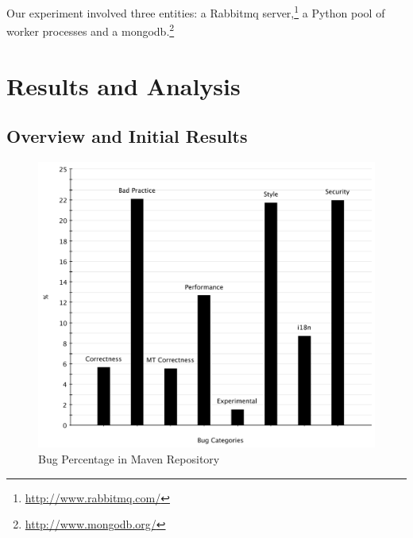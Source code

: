 \documentclass[conference]{IEEEtran}
\begin{document}
Our experiment involved three entities: a Rabbit{\sc mq}
server,\footnote{\url{http://www.rabbitmq.com/}} a Python pool of worker
processes and a mongo{\sc db}.\footnote{\url{http://www.mongodb.org/}}

\section{Results and Analysis}
\label{sec:res}

\subsection{Overview and Initial Results}
\label{sec:overview}

\begin{figure}
	\centering
	\includegraphics[scale=0.6]{bug_percent}
	\caption{Bug Percentage in Maven Repository}
	\label{fig:bug-percentage}
\end{figure}
\end{document}
